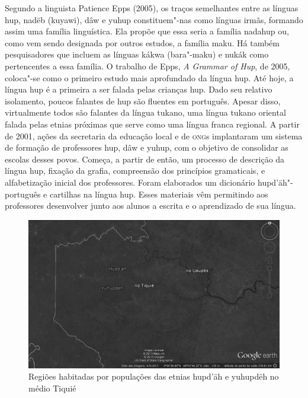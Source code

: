 Segundo a linguista Patience Epps (2005), os traços semelhantes entre as
línguas hup, nadëb (kuyawi), dâw e yuhup constituem"-nas como línguas
irmãs, formando assim uma família linguística. Ela propõe que essa seria
a família nadahup ou, como vem sendo designada por outros estudos, a
família maku. Há também pesquisadores que incluem as línguas kákwa
(bara"-maku) e nukák como pertencentes a essa família. O trabalho de
Epps, \textit{A Grammar of Hup}, de 2005, coloca"-se como o primeiro estudo
mais aprofundado da língua hup. Até hoje, a língua hup é a primeira a
ser falada pelas crianças hup. Dado seu relativo isolamento, poucos
falantes de hup são fluentes em português. Apesar disso, virtualmente
todos são falantes da língua tukano, uma língua tukano oriental falada
pelas etnias próximas que serve como uma língua franca regional. A
partir de 2001, ações da secretaria da educação local e de \textsc{ong}s
implantaram um sistema de formação de professores hup, dâw e yuhup, com
o objetivo de consolidar as escolas desses povos. Começa, a partir de
então, um processo de descrição da língua hup, fixação da grafia,
compreensão dos princípios gramaticais, e alfabetização inicial dos
professores. Foram elaborados um dicionário hupd'äh"-português e
cartilhas na língua hup. Esses materiais vêm permitindo aos professores
desenvolver junto aos alunos a escrita e o aprendizado de sua língua.

\begin{figure}
\centering
\includegraphics[width=\textwidth]{./img/004}
\caption{Regiões habitadas por populações das etnias hupd'äh
e yuhupdëh no médio Tiquié}
\end{figure}

